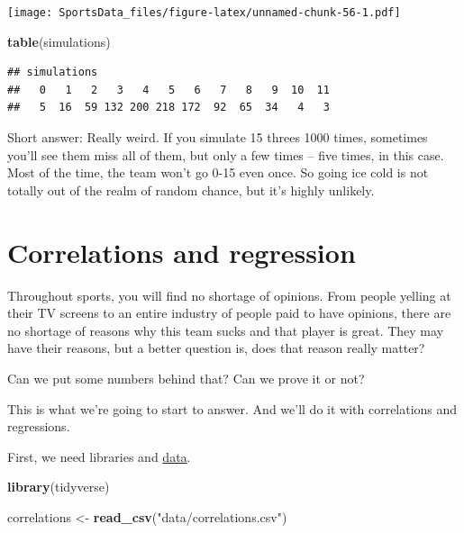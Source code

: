 \documentclass[]{book}
\newenvironment{Shaded}{\begin{snugshade}}{\end{snugshade}}
\newcommand{\KeywordTok}[1]{\textcolor[rgb]{0.13,0.29,0.53}{\textbf{#1}}}
\newcommand{\StringTok}[1]{\textcolor[rgb]{0.31,0.60,0.02}{#1}}
\newcommand{\NormalTok}[1]{#1}
\begin{document}
\texttt{[image: SportsData\_files/figure-latex/unnamed-chunk-56-1.pdf]}

\begin{Shaded}
\begin{Highlighting}[]
\KeywordTok{table}\NormalTok{(simulations)}
\end{Highlighting}
\end{Shaded}

\begin{verbatim}
## simulations
##   0   1   2   3   4   5   6   7   8   9  10  11 
##   5  16  59 132 200 218 172  92  65  34   4   3
\end{verbatim}

Short answer: Really weird. If you simulate 15 threes 1000 times,
sometimes you'll see them miss all of them, but only a few times -- five
times, in this case. Most of the time, the team won't go 0-15 even once.
So going ice cold is not totally out of the realm of random chance, but
it's highly unlikely.

\chapter{Correlations and regression}\label{correlations-and-regression}

Throughout sports, you will find no shortage of opinions. From people
yelling at their TV screens to an entire industry of people paid to have
opinions, there are no shortage of reasons why this team sucks and that
player is great. They may have their reasons, but a better question is,
does that reason really matter?

Can we put some numbers behind that? Can we prove it or not?

This is what we're going to start to answer. And we'll do it with
correlations and regressions.

First, we need libraries and
\href{https://unl.box.com/s/zlxoptqixkt98gubk3i6316qun99l49r}{data}.

\begin{Shaded}
\begin{Highlighting}[]
\KeywordTok{library}\NormalTok{(tidyverse)}
\end{Highlighting}
\end{Shaded}

\begin{Shaded}
\begin{Highlighting}[]
\NormalTok{correlations <-}\StringTok{ }\KeywordTok{read_csv}\NormalTok{(}\StringTok{"data/correlations.csv"}\NormalTok{)}
\end{Highlighting}
\end{Shaded}
\end{document}
